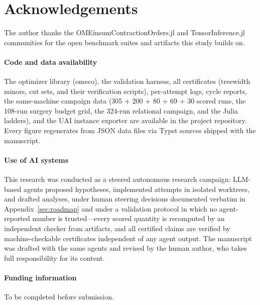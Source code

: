 \documentclass{SciPost}
\begin{document}
\section*{Acknowledgements}
The author thanks the OMEinsumContractionOrders.jl and TensorInference.jl
communities for the open benchmark suites and artifacts this study
builds on.

\paragraph{Code and data availability}
The optimizer library (omeco), the validation harness, all certificates
(treewidth minors, cut sets, and their verification scripts), per-attempt
logs, cycle reports, the same-machine campaign data (305 + 200 + 80 + 69
+ 30 scored runs, the 108-run surgery budget grid, the 324-run
relational campaign, and the Julia ladders), and the UAI instance
exporter are available in the project repository. Every figure regenerates from
JSON data files via Typst sources shipped with the manuscript.

\paragraph{Use of AI systems}
This research was conducted as a steered autonomous research campaign:
LLM-based agents proposed hypotheses, implemented attempts in isolated
worktrees, and drafted analyses, under human steering decisions
documented verbatim in Appendix~\ref{sec:roadmap} and under a validation
protocol in which no agent-reported number is trusted---every scored
quantity is recomputed by an independent checker from artifacts, and all
certified claims are verified by machine-checkable certificates
independent of any agent output. The manuscript was drafted with the
same agents and revised by the human author, who takes full
responsibility for its content.

\paragraph{Funding information}
To be completed before submission.
\end{document}
